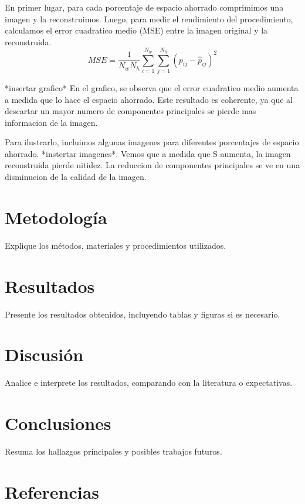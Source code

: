 \documentclass[a4paper,12pt]{article}
\begin{document}
En primer lugar, para cada porcentaje de espacio ahorrado comprimimos una imagen y la reconstruimos. Luego, para medir el rendimiento del procedimiento, calculamos el error cuadratico medio (MSE) entre la imagen original y la reconstruida. 
\begin{equation}
MSE = \frac{1}{N_w N_h} \sum_{i=1}^{N_w} \sum_{j=1}^{N_h} (p_{ij} - \hat{p}_{ij})^2
\end{equation}

*insertar grafico*
En el grafico, se observa que el error cuadratico medio aumenta a medida que lo hace el espacio ahorrado. Este resultado es coherente, ya que al descartar un mayor numero de componentes principales se pierde mas informacion de la imagen. 

Para ilustrarlo, incluimos algunas imagenes para diferentes porcentajes de espacio ahorrado. 
*instertar imagenes*.
Vemos que a medida que S aumenta, la imagen reconstruida pierde nitidez. La reduccion de componentes principales se ve en una disminucion de la calidad de la imagen. 


\section{Metodología}
Explique los métodos, materiales y procedimientos utilizados.

\section{Resultados}
Presente los resultados obtenidos, incluyendo tablas y figuras si es necesario.

\section{Discusión}
Analice e interprete los resultados, comparando con la literatura o expectativas.

\section{Conclusiones}
Resuma los hallazgos principales y posibles trabajos futuros.

\section*{Referencias}


\end{document}
